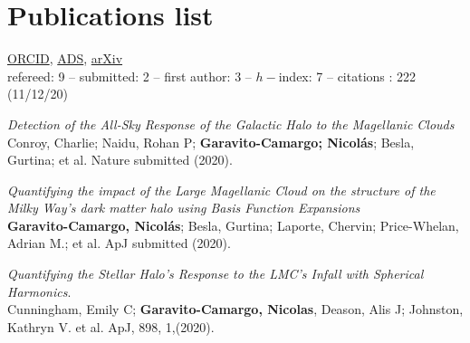 \documentclass[UTF8]{article}
\begin{document}
\section*{Publications list}

\noindent \href{https://orcid.org/0000-0001-7107-1744}{ORCID},
\href{https://ui.adsabs.harvard.edu/search/q=docs(library%2F0X5_bcuLT4iE-6-Nko0kmg)&sort=date%20desc%2C%20bibcode%20desc&p_=0}{ADS},
\href{https://arxiv.org/search/?query=garavito-camargo&searchtype=all}{arXiv}\\
refereed: 9 -- submitted: 2 -- first author: 3 -- $h-$index: 7 -- citations :
222 (11/12/20) 
\begin{etaremune}

\item \textit{Detection of the All-Sky Response of the Galactic
  Halo to the Magellanic Clouds}\\ 
  Conroy, Charlie; Naidu, Rohan P; \textbf{Garavito-Camargo; Nicol\'as}; Besla, Gurtina; et al. Nature submitted (2020). 


\item \textit{Quantifying the impact of the Large Magellanic Cloud on the
  structure of the Milky Way’s dark matter halo using Basis Function Expansions}\\ 
  \textbf{Garavito-Camargo, Nicol\'as}; Besla, Gurtina; Laporte,
  Chervin; Price-Whelan, Adrian M.; et al. ApJ submitted (2020). 

\item \textit{Quantifying the Stellar Halo's Response to the LMC's Infall with
  Spherical Harmonics}.\\
  Cunningham, Emily C; \textbf{Garavito-Camargo, Nicolas}, Deason, Alis J;
  Johnston, Kathryn V. et al. ApJ, 898, 1,(2020).


\end{etaremune}
\end{document}

